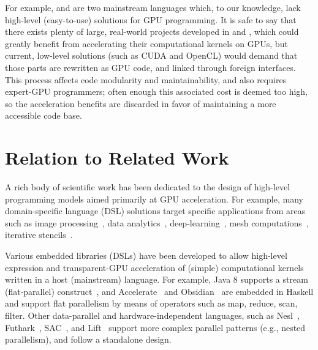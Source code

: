 %
For example, \csharp{} and \fsharp{} are two mainstream languages which, to
our knowledge, lack high-level (easy-to-use) solutions for GPU programming.
%
It is safe to say that there exists plenty of large, real-world projects
developed in \csharp{} and \fsharp{}, which could greatly benefit from 
accelerating their computational kernels on GPUs, but current, low-level
solutions (such as CUDA and OpenCL) would demand that those parts are 
rewritten as GPU code, and linked through foreign interfaces. 
This process affects code modularity and maintainability, and also requires
expert-GPU programmers; often enough this associated cost is deemed too high,
so the acceleration benefits are discarded in favor of maintaining a more 
accessible code base.

\section{Relation to Related Work}
%
A rich body of scientific work has been dedicated to the design of high-level 
programming models aimed primarily at GPU acceleration.  
%
For example, many domain-specific language (DSL) solutions target specific 
applications from areas such as image processing~\cite{Halide}, data 
analytics~\cite{HPAT}, deep-learning~\cite{DeliteDSLs}, mesh 
computations~\cite{OP2-Mesh}, iterative stencils~\cite{tang2011pochoir}. 

Various embedded libraries (DSLs) have been developed to allow high-level
expression and transparent-GPU acceleration of (simple) computational 
kernels written in a host (mainstream) language. For example, 
Java $8$ supports a stream (flat-parallel) construct~\cite{StreamJava8},
and Accelerate~\cite{Accelerate-DAMP,AccelerateStreaming} and 
Obsidian~\cite{svensson2011obsidian} are embedded in Haskell and support 
flat parallelism by means of operators such as map, reduce, scan, filter.
%
Other data-parallel and hardware-independent languages, such as 
Nesl~\cite{blelloch1994implementation,Bergstrom:2012:NDG:2398856.2364563},
Futhark~\cite{pldi17,Futhark:redomap,Futhark-ICFP18}, 
SAC~\cite{SaCShared2005,GrelSchoIJPP06}, and Lift~\cite{Lift-CGO17,Lift-ICFP}
support more complex parallel patterns (e.g., nested parallelism), 
and follow a standalone design.

